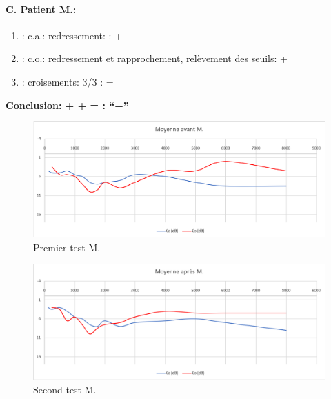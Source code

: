          \paragraph{ C. Patient M.:}
	\begin{enumerate}

 		\item : c.a.: redressement: : +   %

 		\item : c.o.: redressement et rapprochement,
                  relèvement des seuils:  +     %
 		\item : croisements: 3/3 :  =

                \end{enumerate}

                \textbf{  Conclusion:  +  +  =     : ``+''}

                \begin{figure}[th]
\centering
\includegraphics[width=1\linewidth]{images/graphiques/m_pre.png}
\caption[Patient M. : 1° test]{Premier test M.}

\end{figure}


                        \begin{figure}[th]
\centering
\includegraphics[width=1\linewidth]{images/graphiques/m_post.png}
\caption[Patient M. : 2° test]{Second test M.}

\end{figure}

